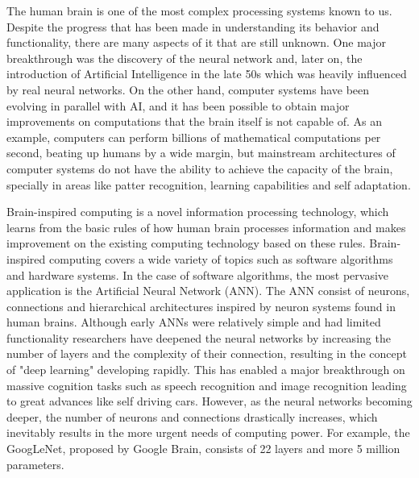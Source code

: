 The human brain is one of the most complex processing systems known to us. Despite the progress that has been made in understanding its behavior and functionality, there are many aspects of it that are still unknown. One major breakthrough was the discovery of the neural network and, later on, the introduction of Artificial Intelligence in the late 50s which was heavily influenced by real neural networks. On the other hand, computer systems have been evolving in parallel with AI, and it has been possible to obtain major improvements on computations that the brain itself is not capable of. As an example, computers can perform billions of mathematical computations per second, beating up humans by a wide margin, but mainstream architectures of computer systems do not have the ability to achieve the capacity of the brain, specially in areas like patter recognition, learning capabilities and self adaptation. 

Brain-inspired computing is a novel information processing technology, which learns from the basic rules of how human brain processes information and makes improvement on the existing computing technology based on these rules. Brain-inspired computing covers a wide variety of topics such as software algorithms and hardware systems. In the case of software algorithms, the most pervasive application is the Artificial Neural Network (ANN). The ANN consist of neurons, connections and hierarchical architectures inspired by neuron systems found in human brains. Although early ANNs were relatively simple and had limited functionality researchers have deepened the neural networks by increasing the number of layers and the complexity of their connection, resulting in the concept of "deep learning" developing rapidly. This has enabled a major breakthrough on massive cognition tasks such as speech recognition and image recognition leading to great advances like self driving cars. However, as the neural networks becoming deeper, the number of neurons and connections drastically increases, which inevitably results in the more urgent needs of computing power. For example, the GoogLeNet, proposed by Google Brain, consists of 22 layers and more 5 million parameters. 

